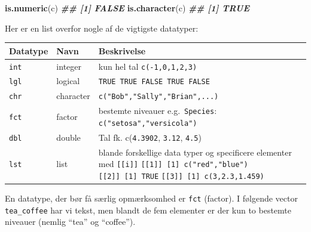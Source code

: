 \documentclass[
]{book}
\newenvironment{Shaded}{\begin{snugshade}}{\end{snugshade}}
\newcommand{\DocumentationTok}[1]{\textcolor[rgb]{0.56,0.35,0.01}{\textbf{\textit{#1}}}}
\newcommand{\FunctionTok}[1]{\textcolor[rgb]{0.13,0.29,0.53}{\textbf{#1}}}
\newcommand{\NormalTok}[1]{#1}
\begin{document}
\begin{Shaded}
\begin{Highlighting}[]
\FunctionTok{is.numeric}\NormalTok{(c)}
\DocumentationTok{\#\# [1] FALSE}
\FunctionTok{is.character}\NormalTok{(c)}
\DocumentationTok{\#\# [1] TRUE}
\end{Highlighting}
\end{Shaded}

Her er en list overfor nogle af de vigtigste datatyper:

\begin{longtable}[]{@{}
  >{\raggedright\arraybackslash}p{}
  >{\raggedright\arraybackslash}p{}
  >{\raggedright\arraybackslash}p{}@{}}
\toprule\noalign{}
\begin{minipage}[b]{\linewidth}\raggedright
Datatype
\end{minipage} & \begin{minipage}[b]{\linewidth}\raggedright
Navn
\end{minipage} & \begin{minipage}[b]{\linewidth}\raggedright
Beskrivelse
\end{minipage} \\
\midrule\noalign{}
\endhead
\bottomrule\noalign{}
\endlastfoot
\texttt{int} & integer & kun hel tal \texttt{c(-1,0,1,2,3)} \\
\texttt{lgl} & logical & \texttt{TRUE\ TRUE\ FALSE\ TRUE\ FALSE} \\
\texttt{chr} & character & \texttt{c("Bob","Sally","Brian",...)} \\
\texttt{fct} & factor & bestemte niveauer e.g.~\texttt{Species}: \texttt{c("setosa","versicola")} \\
\texttt{dbl} & double & Tal fk. c(\texttt{4.3902}, \texttt{3.12}, \texttt{4.5}) \\
\texttt{lst} & list & blande forskellige data typer og specificere elementer med \texttt{{[}{[}i{]}{]}} \texttt{{[}{[}1{]}{]}\ {[}1{]}\ c("red","blue")} \texttt{{[}{[}2{]}{]}\ {[}1{]}\ TRUE} \texttt{{[}{[}3{]}{]}\ {[}1{]}\ c(3,2.3,1.459)} \\
\end{longtable}

En datatype, der bør få særlig opmærksomhed er \texttt{fct} (factor). I følgende vector \texttt{tea\_coffee} har vi tekst, men blandt de fem elementer er der kun to bestemte niveauer (nemlig ``tea'' og ``coffee'').
\end{document}
